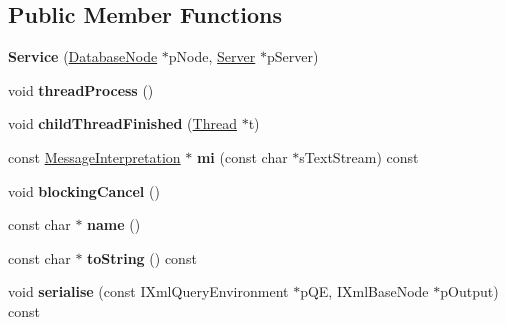 \subsection*{\-Public \-Member \-Functions}
\begin{DoxyCompactItemize}
\item 
\hypertarget{classgeneral__server_1_1Service_ae4160a4e1f4af5310db1f168639aef68}{{\bfseries \-Service} (\hyperlink{classgeneral__server_1_1DatabaseNode}{\-Database\-Node} $\ast$p\-Node, \hyperlink{classgeneral__server_1_1Server}{\-Server} $\ast$p\-Server)}\label{classgeneral__server_1_1Service_ae4160a4e1f4af5310db1f168639aef68}

\item 
\hypertarget{classgeneral__server_1_1Service_a38f397755a0ef609e6e1e57c9fe91186}{void {\bfseries thread\-Process} ()}\label{classgeneral__server_1_1Service_a38f397755a0ef609e6e1e57c9fe91186}

\item 
\hypertarget{classgeneral__server_1_1Service_a3c61341b91f3f79d15f695495be73ad9}{void {\bfseries child\-Thread\-Finished} (\hyperlink{classgeneral__server_1_1Thread}{\-Thread} $\ast$t)}\label{classgeneral__server_1_1Service_a3c61341b91f3f79d15f695495be73ad9}

\item 
\hypertarget{classgeneral__server_1_1Service_a77832f36d64e66a9b94dd11f2a1f59db}{const \hyperlink{classgeneral__server_1_1MessageInterpretation}{\-Message\-Interpretation} $\ast$ {\bfseries mi} (const char $\ast$s\-Text\-Stream) const }\label{classgeneral__server_1_1Service_a77832f36d64e66a9b94dd11f2a1f59db}

\item 
\hypertarget{classgeneral__server_1_1Service_a9afbbd0384bc4b99c5c055c5d359dea0}{void {\bfseries blocking\-Cancel} ()}\label{classgeneral__server_1_1Service_a9afbbd0384bc4b99c5c055c5d359dea0}

\item 
\hypertarget{classgeneral__server_1_1Service_a6c0f5b66b0cc321334ecfe0950690c9a}{const char $\ast$ {\bfseries name} ()}\label{classgeneral__server_1_1Service_a6c0f5b66b0cc321334ecfe0950690c9a}

\item 
\hypertarget{classgeneral__server_1_1Service_a2ee4f2e8401d8aa28e8ca96b06fc194b}{const char $\ast$ {\bfseries to\-String} () const }\label{classgeneral__server_1_1Service_a2ee4f2e8401d8aa28e8ca96b06fc194b}

\item 
\hypertarget{classgeneral__server_1_1Service_a97e342c51d9a5b9460edc47ca67dbc0c}{void {\bfseries serialise} (const \-I\-Xml\-Query\-Environment $\ast$p\-Q\-E, \-I\-Xml\-Base\-Node $\ast$p\-Output) const }\label{classgeneral__server_1_1Service_a97e342c51d9a5b9460edc47ca67dbc0c}


\end{DoxyCompactItemize}
